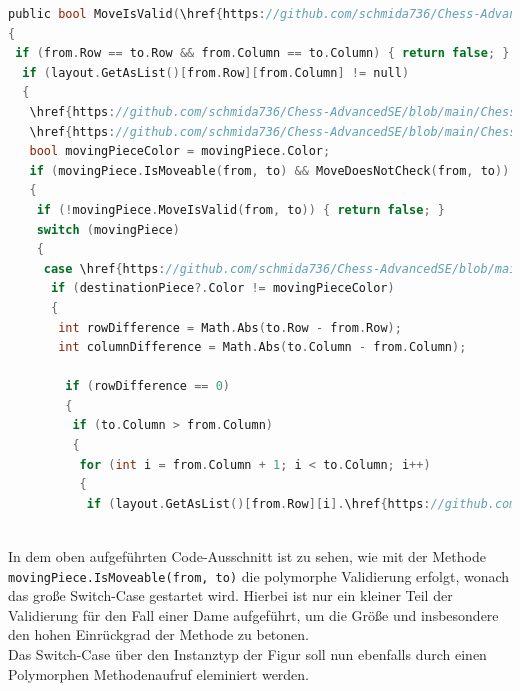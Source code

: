 \documentclass[
10pt, %
a4paper, %
oneside, %
headinclude,footinclude, %
BCOR5mm, %
]{scrartcl}
\begin{document}
\begin{onehalfspace}
\begin{lstlisting}[language=c, style=mStyle]
public bool MoveIsValid(\href{https://github.com/schmida736/Chess-AdvancedSE/blob/main/Chess-AdvancedSE/Game\%20Elements/Square.cs}{Square} from, \href{https://github.com/schmida736/Chess-AdvancedSE/blob/main/Chess-AdvancedSE/Game\%20Elements/Square.cs}{Square} to)
{
 if (from.Row == to.Row && from.Column == to.Column) { return false; }
  if (layout.GetAsList()[from.Row][from.Column] != null)
  {
   \href{https://github.com/schmida736/Chess-AdvancedSE/blob/main/Chess-AdvancedSE/Game\%20Elements/Pieces/Piece.cs}{Piece} movingPiece = layout.GetAsList()[from.Row][from.Column].\href{https://github.com/schmida736/Chess-AdvancedSE/blob/main/Chess-AdvancedSE/Game\%20Elements/Pieces/Piece.cs}{Piece};
   \href{https://github.com/schmida736/Chess-AdvancedSE/blob/main/Chess-AdvancedSE/Game\%20Elements/Pieces/Piece.cs}{Piece} destinationPiece = layout.GetAsList()[to.Row][to.Column].\href{https://github.com/schmida736/Chess-AdvancedSE/blob/main/Chess-AdvancedSE/Game\%20Elements/Pieces/Piece.cs}{Piece};
   bool movingPieceColor = movingPiece.Color;
   if (movingPiece.IsMoveable(from, to) && MoveDoesNotCheck(from, to))
   {
	if (!movingPiece.MoveIsValid(from, to)) { return false; }
	switch (movingPiece)
	{
	 case \href{https://github.com/schmida736/Chess-AdvancedSE/blob/main/Chess-AdvancedSE/Game\%20Elements/Pieces/Queen.cs}{Queen}:
	  if (destinationPiece?.Color != movingPieceColor)
	  {
	   int rowDifference = Math.Abs(to.Row - from.Row);
	   int columnDifference = Math.Abs(to.Column - from.Column);

	    if (rowDifference == 0)
		{
		 if (to.Column > from.Column)
		 {
		  for (int i = from.Column + 1; i < to.Column; i++)
		  {
		   if (layout.GetAsList()[from.Row][i].\href{https://github.com/schmida736/Chess-AdvancedSE/blob/main/Chess-AdvancedSE/Game\%20Elements/Pieces/Piece.cs}{Piece} != null) { return false; }
		  
\end{lstlisting}
In dem oben aufgeführten Code-Ausschnitt ist zu sehen, wie mit der Methode \texttt{movingPiece.IsMoveable(from, to)} die polymorphe Validierung erfolgt, wonach das große Switch-Case gestartet wird. Hierbei ist nur ein kleiner Teil der Validierung für den Fall einer Dame aufgeführt, um die Größe  und insbesondere den hohen Einrückgrad der Methode zu betonen. \\
Das Switch-Case über den Instanztyp der Figur soll nun ebenfalls durch einen Polymorphen Methodenaufruf eleminiert werden. 


\end{onehalfspace}
\end{document}
